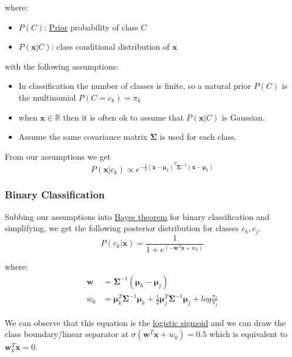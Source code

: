 \documentclass[12pt]{article}
\begin{document}
        where:
        \begin{itemize}
            \item $P(C)$: \hyperref[fact:Prior]{Prior} probability of class $C$
            \item $P(\boldsymbol{x}|C)$: class conditional distribution of $\boldsymbol{x}$
        \end{itemize}

        with the following assumptions:
        \begin{itemize}
            \item In classification the number of classes is finite, so a natural prior $P(C)$ is the multinomial $P(C =
            c_k) = \pi_k$
            \item when $\boldsymbol{x} \in \mathbb{R}$ then it is often ok to assume that $P(\boldsymbol{x}|C)$ is
            Gaussian.
            \item Assume the same covariance matrix $\boldsymbol{\Sigma}$ is used for each class.
        \end{itemize}

        From our assumptions we get
        $$P(\boldsymbol{x}|c_k) \propto e^{-\frac{1}{2}(\boldsymbol{x} - \boldsymbol{\mu}_k)^T
        \boldsymbol{\Sigma}^{-1}(\boldsymbol{x} - \boldsymbol{\mu}_k)} $$


        \subsubsection{Binary Classification}
            Subbing our assumptions into \hyperref[fact:Bayes]{Bayes theorem} for binary classification and simplifying,
            we get the following posterior distribution for classes $c_k, c_j$.
            $$ P(c_k|\boldsymbol{x}) = \frac{1}{1+e^{(-\boldsymbol{w}^T\boldsymbol{x} + w_0)}} $$

        where:
        \begin{align*}
            \boldsymbol{w} &= \boldsymbol{\Sigma}^{-1}(\boldsymbol{\mu}_k - \boldsymbol{\mu}_j) \\
            w_0 &= \boldsymbol{\mu}^T_k \boldsymbol{\Sigma}^{-1}\boldsymbol{\mu}_k + \frac{1}{2}\boldsymbol{\mu}^T_j\boldsymbol{\Sigma}^{-1}\boldsymbol{\mu}_j + log\frac{\pi_k}{\pi_j}
        \end{align*}

        We can observe that this equation is the \hyperref[sec:Sigmoid]{logistic sigmoid} and we can draw the class
        boundary/linear separator at $\sigma(\boldsymbol{w}^T\boldsymbol{x} + w_0) = 0.5$ which is equivalent to
        $\boldsymbol{w}^T_k \overline{\boldsymbol{x}} = 0$.
        
\end{document}
